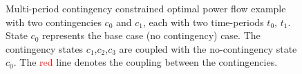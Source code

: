 \begin{figure}[h!]
\caption{Multi-period contingency constrained optimal power flow example with two contingencies $c_0$ and $c_1$, each with two time-periods $t_0$, $t_1$. State $c_0$ represents the base case (no contingency) case. The contingency states $c_1$,$c_2$,$c_3$ are coupled with the no-contingency state $c_0$. The {\textcolor{red}{red}} line denotes the coupling between the contingencies.}
\label{fig:ctopflow}
\end{figure}

